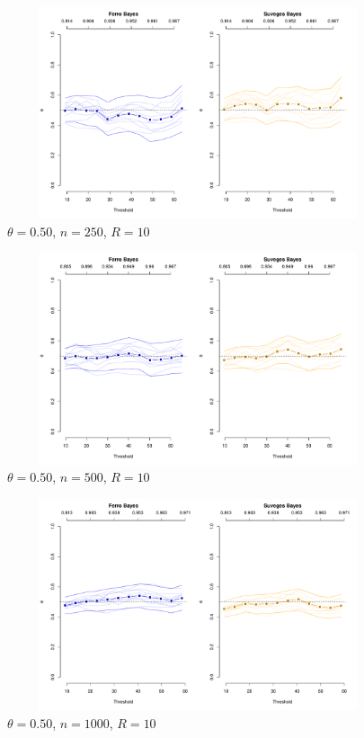 \documentclass[12pt]{article}
\begin{document}
\newpage

\begin{figure}
\begin{center}
\includegraphics[width=5.5in, height=2.45in]{../extremal_comparison/figs/sim_frechet_hier_50_250_10.pdf}
\caption{$\theta=0.50$, $n=250$, $R=10$}
\end{center}
\end{figure}

\begin{figure}
\begin{center}
\includegraphics[width=5.5in, height=2.45in]{../extremal_comparison/figs/sim_frechet_hier_50_500_10.pdf}
\caption{$\theta=0.50$, $n=500$, $R=10$}
\end{center}
\end{figure}

\begin{figure}
\begin{center}
\includegraphics[width=5.5in, height=2.45in]{../extremal_comparison/figs/sim_frechet_hier_50_1000_10.pdf}
\caption{$\theta=0.50$, $n=1000$, $R=10$}
\end{center}
\end{figure}
\end{document}
